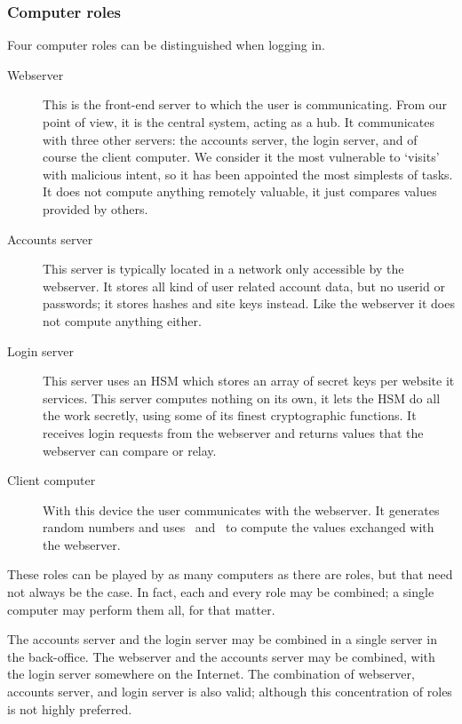 \subsubsection{Computer roles}
Four computer roles can be distinguished when logging in.
\begin{description}
\item[Webserver]
	This is the front-end server to which the user is communicating.
	From our point of view,
	it is the central system,
	acting as a hub.
	It communicates with three other servers:
	the accounts server, the login server, and of course the client computer.
	We consider it the most vulnerable to `visits' with malicious intent,
	so it has been appointed the most simplests of tasks.
	It does not compute anything remotely valuable,
	it just compares values provided by others.
\item[Accounts server]
	This server is typically located in a network only accessible by the webserver.
	It stores all kind of user related account data, but no userid or passwords;
	it stores hashes and site keys instead.
	Like the webserver it does not compute anything either.
\item[Login server]
	This server uses an HSM which stores an array of secret keys per website it services.
	This server computes nothing on its own,
	it lets the HSM do all the work secretly,
	using some of its finest cryptographic functions.
	It receives login requests from the webserver and returns values that the webserver can compare or relay.
\item[Client computer]
	With this device the user communicates with the webserver.
	It generates random numbers and uses \XOR\ and \SHA\ to compute the values exchanged with the webserver.
\end{description}
These roles can be played by as many computers as there are roles,
but that need not always be the case.
In fact,
each and every role may be combined;
a single computer may perform them all,
for that matter.
\par
The accounts server and the login server may be combined in a single server in the back-office.
The webserver and the accounts server may be combined,
with the login server somewhere on the Internet.
The combination of webserver, accounts server, and login server is also valid;
although this concentration of roles is not highly preferred.
